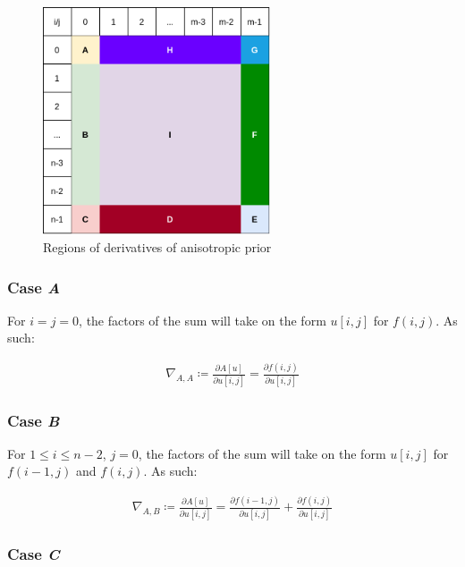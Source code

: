\documentclass[a4paper]{scrreprt}
\begin{document}
\begin{figure}
		\centering
		\includegraphics[width=0.6\textwidth]{resources/gaussian_prior_derivatives.png}
		\caption{Regions of derivatives of anisotropic prior}
		\label{fig:anisotropic_prior_derivatives}
\end{figure}


\subsubsection{Case \emph{A}}

For $i = j = 0$, the factors of the sum will take on the form $u[i, j]$ for
$f(i, j)$. As such:

\begin{align*}
		\nabla_{A, A} \coloneqq \frac{\partial A[u]}{\partial u[i, j]} = 
		  \frac{\partial f(i, j)}{\partial u[i, j]}
\end{align*}

\subsubsection{Case \emph{B}}

For $1 \leq i \leq n - 2$, $j = 0$, the factors of the sum will take on the
form $u[i, j]$ for $f(i - 1, j)$ and $f(i, j)$. As such:

\begin{align*}
		\nabla_{A, B} \coloneqq \frac{\partial A[u]}{\partial u[i, j]} = 
		  \frac{\partial f(i - 1, j)}{\partial u[i, j]} 
		  + \frac{\partial f(i, j)}{\partial u[i, j]}
\end{align*}

\subsubsection{Case \emph{C}}
\end{document}
